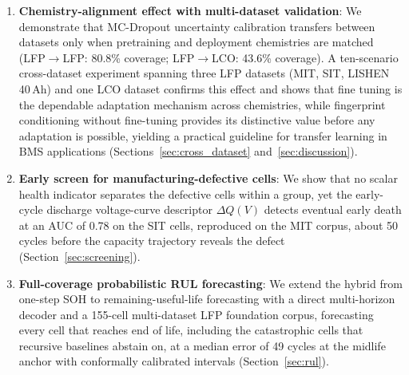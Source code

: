 \begin{enumerate}
  \item \textbf{Chemistry-alignment effect with multi-dataset validation}:
        We demonstrate that MC-Dropout uncertainty calibration transfers between
        datasets only when pretraining and deployment chemistries are matched
        (LFP$\rightarrow$LFP: 80.8\% coverage; LFP$\rightarrow$LCO: 43.6\%
        coverage).
        A ten-scenario cross-dataset experiment spanning three LFP datasets
        (MIT, SIT, LISHEN 40\,Ah) and one LCO dataset confirms this effect
        and shows that fine tuning is the dependable adaptation mechanism
        across chemistries, while fingerprint conditioning without fine-tuning
        provides its distinctive value before any adaptation is possible, yielding a
        practical guideline for transfer learning in BMS applications
        (Sections~\ref{sec:cross_dataset} and~\ref{sec:discussion}).

  \item \textbf{Early screen for manufacturing-defective cells}: We show that
        no scalar health indicator separates the defective cells within a group,
        yet the early-cycle discharge voltage-curve descriptor $\Delta Q(V)$
        detects eventual early death at an AUC of 0.78 on the SIT cells,
        reproduced on the MIT corpus, about 50 cycles before the capacity
        trajectory reveals the defect (Section~\ref{sec:screening}).

  \item \textbf{Full-coverage probabilistic RUL forecasting}: We extend the
        hybrid from one-step SOH to remaining-useful-life forecasting with a
        direct multi-horizon decoder and a 155-cell multi-dataset LFP foundation
        corpus, forecasting every cell that reaches end of life, including the
        catastrophic cells that recursive baselines abstain on, at a median
        error of 49 cycles at the midlife anchor with conformally calibrated
        intervals (Section~\ref{sec:rul}).
\end{enumerate}
